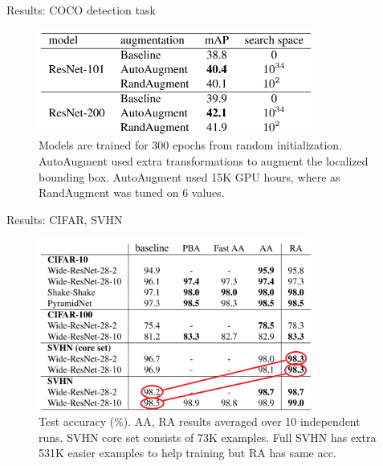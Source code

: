 \documentclass{beamer}
\begin{document}
\begin{frame}{Results: COCO detection task}
\begin{figure}[h]
\includegraphics[width=0.8\textwidth]{img/coco}
\caption{Models are trained for 300 epochs from random initialization. AutoAugment used extra transformations to augment the localized bounding box. AutoAugment used 15K GPU hours, where as RandAugment was tuned on 6 values.}
\end{figure}
\end{frame}
\begin{frame}{Results: CIFAR, SVHN}
\begin{figure}[h]
\includegraphics[width=0.8\textwidth]{img/svhn}
\caption{Test accuracy (\%). AA, RA results averaged over 10 independent runs. SVHN core set consists of 73K examples. Full SVHN has extra 531K easier examples to help training but RA has same acc.}
\end{figure}
\end{frame}
\end{document}
